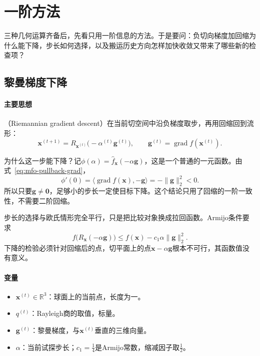 \section{一阶方法}
\label{sec:mfo-first-order}

三种几何运算齐备后，先看只用一阶信息的方法。于是要问：负切向梯度加回缩为什么能下降，步长如何选择，以及搬运历史方向怎样加快收敛又带来了哪些新的检查项？

\subsection{黎曼梯度下降}
\label{sec:mfo-rgd}

\paragraph{主要思想}
（Riemannian gradient descent）在当前切空间中沿负梯度取步，再用回缩回到流形：
\begin{equation}
 \bm{x}^{(t+1)}=R_{\bm{x}^{(t)}}\bigl(-\alpha^{(t)}\bm{g}^{(t)}\bigr),\qquad\bm{g}^{(t)}=\operatorname{grad}f(\bm{x}^{(t)}).
 \label{eq:mfo-rgd}
\end{equation}

为什么这一步能下降？记$\phi(\alpha)=\hat{f}_{\bm{x}}(-\alpha\bm{g})$，这是一个普通的一元函数。由式~\eqref{eq:mfo-pullback-grad}，
\[
 \phi'(0)=\langle\operatorname{grad}f(\bm{x}),-\bm{g}\rangle=-\lVert\bm{g}\rVert_2^2<0.
\]
所以只要$\bm{g}\neq\bm{0}$，足够小的步长一定使目标下降。这个结论只用了回缩的一阶一致性，不需要二阶回缩。

步长的选择与欧氏情形完全平行，只是把比较对象换成拉回函数。Armijo条件要求
\begin{equation}
 f\bigl(R_{\bm{x}}(-\alpha\bm{g})\bigr)\leq f(\bm{x})-c_1\alpha\lVert\bm{g}\rVert_2^2.
 \label{eq:mfo-armijo}
\end{equation}
下降的检验必须针对回缩后的点，切平面上的点$\bm{x}-\alpha\bm{g}$根本不可行，其函数值没有意义。

\paragraph{变量}
\begin{itemize}
 \item $\bm{x}^{(t)}\in\mathbb{R}^3$：球面上的当前点，长度为一。
 \item $q^{(t)}$：Rayleigh商的取值，标量。
 \item $\bm{g}^{(t)}$：黎曼梯度，与$\bm{x}^{(t)}$垂直的三维向量。
 \item $\alpha$：当前试探步长；$c_1=\tfrac14$是Armijo常数，缩减因子取$\tfrac12$。
\end{itemize}

